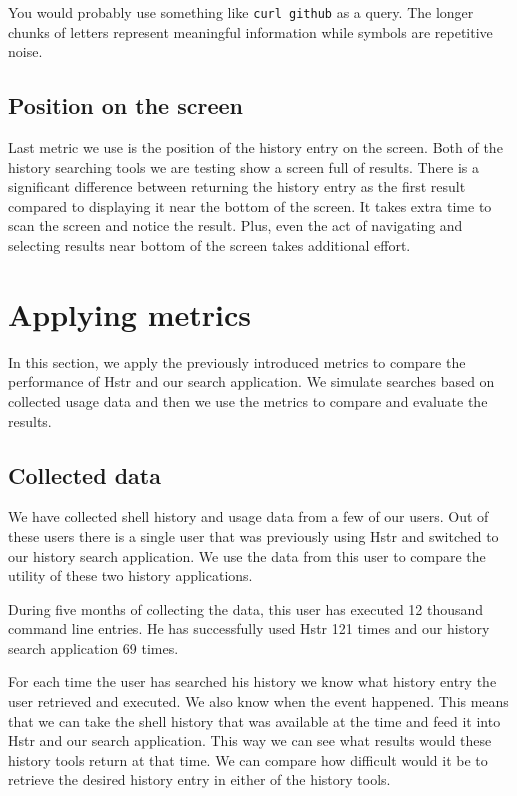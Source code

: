 You would probably use something like \verb|curl github| as a query. The longer chunks of letters represent meaningful information while symbols are repetitive noise.

\subsection{Position on the screen}

Last metric we use is the position of the history entry on the screen. Both of the history searching tools we are testing show a screen full of results. There is a significant difference between returning the history entry as the first result compared to displaying it near the bottom of the screen. It takes extra time to scan the screen and notice the result. Plus, even the act of navigating and selecting results near bottom of the screen takes additional effort.

\section{Applying metrics}

In this section, we apply the previously introduced metrics to compare the performance of Hstr and our search application. We simulate searches based on collected usage data and then we use the metrics to compare and evaluate the results. 

\subsection{Collected data}

We have collected shell history and usage data from a few of our users. Out of these users there is a single user that was previously using Hstr and switched to our history search application. We use the data from this user to compare the utility of these two history applications.

During five months of collecting the data, this user has executed 12 thousand command line entries. He has successfully used Hstr 121 times and our history search application 69 times. 

For each time the user has searched his history we know what history entry the user retrieved and executed. We also know when the event happened. This means that we can take the shell history that was available at the time and feed it into Hstr and our search application. This way we can see what results would these history tools return at that time. We can compare how difficult would it be to retrieve the desired history entry in either of the history tools. 

